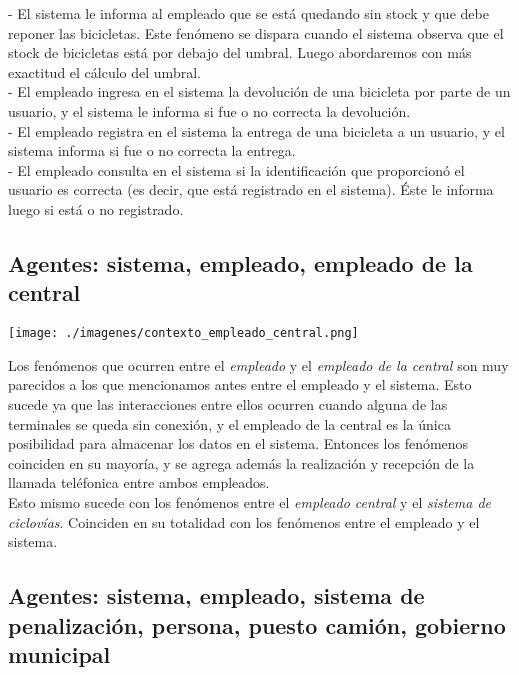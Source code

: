 \documentclass[a4paper, 11pt, spanish]{article}
\begin{document}
- El sistema le informa al empleado que se está quedando sin stock y que debe reponer las bicicletas. Este fenómeno se dispara cuando el sistema observa que el stock de bicicletas está por debajo del umbral. Luego abordaremos con más exactitud el cálculo del umbral.\\

- El empleado ingresa en el sistema la devolución de una bicicleta por parte de un usuario, y el sistema le informa si fue o no correcta la devolución.\\

- El empleado registra en el sistema la entrega de una bicicleta a un usuario, y el sistema informa si fue o no correcta la entrega.\\

- El empleado consulta en el sistema si la identificación que proporcionó el usuario es correcta (es decir, que está registrado en el sistema). Éste le informa luego si está o no registrado.\\

\subsection{Agentes: sistema, empleado, empleado de la central}

\centerline{\texttt{[image: ./imagenes/contexto\_empleado\_central.png]}}

Los fenómenos que ocurren entre el \textit{empleado} y el \textit{empleado de la central} son muy parecidos a los que mencionamos antes entre el empleado y el sistema. Esto sucede ya que las interacciones entre ellos ocurren cuando alguna de las terminales se queda sin conexión, y el empleado de la central es la única posibilidad para almacenar los datos en el sistema. Entonces los fenómenos coinciden en su mayoría, y se agrega además la realización y recepción de la llamada teléfonica entre ambos empleados.\\

Esto mismo sucede con los fenómenos entre el \textit{empleado central} y el \textit{sistema de ciclovías}. Coinciden en su totalidad con los fenómenos entre el empleado y el sistema.\\

\subsection{Agentes: sistema, empleado, sistema de penalización, persona, puesto camión, gobierno municipal}
\end{document}
